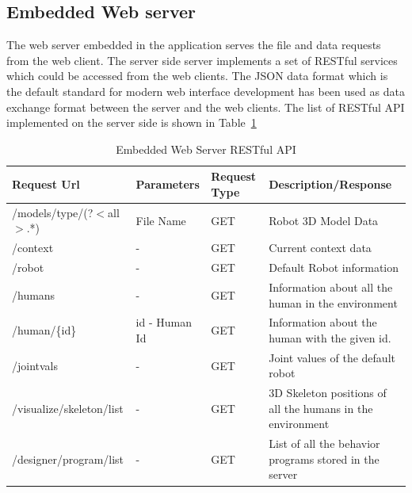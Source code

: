 \subsection*{Embedded Web server}
The web server embedded in the application serves the file and data requests from the web client. The server side server implements a set of RESTful services which could be accessed from the web clients. The JSON data format which is the default standard for modern web interface development has been used as data exchange format between the server and the web clients. The list of RESTful API implemented on the server side is shown in Table~\ref{table:restful_api}
\begin{table}[H]
\centering
\small
\caption{Embedded Web Server RESTful API}
\label{table:restful_api}
\begin{tabular}{|l|p{2.8cm}|p{1.2cm}|p{5.5cm}|}
\hline
  \textbf{Request Url}  & \textbf{Parameters} & \textbf{Request Type} & \textbf{Description/Response}
  \tabularnewline \hline
  /models/{type}/(?$<$all$>$.*) & File Name & GET & Robot 3D Model Data
                                          \tabularnewline\hline
                                          
  /context  & - & GET & Current context data  
  										                    \tabularnewline\hline
  										 
  /robot  &  - & GET & Default Robot information  
  										                    \tabularnewline\hline										 
  
  /humans & - & GET  & Information about all the human in the environment  
                                          \tabularnewline\hline
                                          
  /human/\{id\} & id - Human Id & GET  & Information about the human with the given id.  
                                          \tabularnewline\hline
                                          
  /jointvals & - & GET  & Joint values of the default robot  
                                          \tabularnewline\hline
                                          
  /visualize/skeleton/list & - & GET  & 3D Skeleton positions of all the humans in the environment  
                                          \tabularnewline\hline                                        
       
  /designer/program/list & - & GET  & List of all the behavior programs stored in the server  
                                          \tabularnewline\hline                                                               
                                          

\end{tabular}
\end{table}
